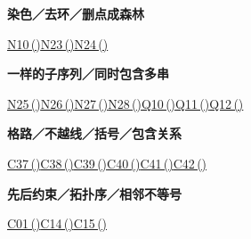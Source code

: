 \documentclass[10pt,a4paper]{article}
\newcommand{\grouphead}[1]{\needspace{7\baselineskip}\par\vspace{7pt}{\large\bfseries #1}\par\vspace{5pt}}
\begin{document}
\begin{minipage}{\linewidth}\textbf{染色／去环／删点成森林}\par{\fontsize{9.5}{12}\selectfont \hyperref[N10]{N10\,(\pageref*{N10})}\hspace{.5em}\allowbreak \hyperref[N23]{N23\,(\pageref*{N23})}\hspace{.5em}\allowbreak \hyperref[N24]{N24\,(\pageref*{N24})}}\end{minipage}\par\vspace{5pt}
\begin{minipage}{\linewidth}\textbf{一样的子序列／同时包含多串}\par{\fontsize{9.5}{12}\selectfont \hyperref[N25]{N25\,(\pageref*{N25})}\hspace{.5em}\allowbreak \hyperref[N26]{N26\,(\pageref*{N26})}\hspace{.5em}\allowbreak \hyperref[N27]{N27\,(\pageref*{N27})}\hspace{.5em}\allowbreak \hyperref[N28]{N28\,(\pageref*{N28})}\hspace{.5em}\allowbreak \hyperref[Q10]{Q10\,(\pageref*{Q10})}\hspace{.5em}\allowbreak \hyperref[Q11]{Q11\,(\pageref*{Q11})}\hspace{.5em}\allowbreak \hyperref[Q12]{Q12\,(\pageref*{Q12})}}\end{minipage}\par\vspace{5pt}
\grouphead{计数、排列与多项式}
\begin{minipage}{\linewidth}\textbf{格路／不越线／括号／包含关系}\par{\fontsize{9.5}{12}\selectfont \hyperref[C37]{C37\,(\pageref*{C37})}\hspace{.5em}\allowbreak \hyperref[C38]{C38\,(\pageref*{C38})}\hspace{.5em}\allowbreak \hyperref[C39]{C39\,(\pageref*{C39})}\hspace{.5em}\allowbreak \hyperref[C40]{C40\,(\pageref*{C40})}\hspace{.5em}\allowbreak \hyperref[C41]{C41\,(\pageref*{C41})}\hspace{.5em}\allowbreak \hyperref[C42]{C42\,(\pageref*{C42})}}\end{minipage}\par\vspace{5pt}
\begin{minipage}{\linewidth}\textbf{先后约束／拓扑序／相邻不等号}\par{\fontsize{9.5}{12}\selectfont \hyperref[C01]{C01\,(\pageref*{C01})}\hspace{.5em}\allowbreak \hyperref[C14]{C14\,(\pageref*{C14})}\hspace{.5em}\allowbreak \hyperref[C15]{C15\,(\pageref*{C15})}}\end{minipage}\par\vspace{5pt}
\end{document}
